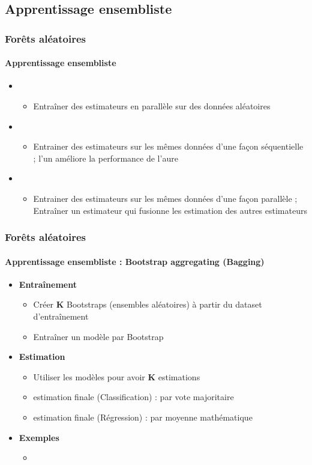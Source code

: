 \documentclass[xcolor=table]{beamer}
\begin{document}
\subsection{Apprentissage ensembliste}

\begin{frame}
	\frametitle{Forêts aléatoires}
	\framesubtitle{Apprentissage ensembliste}
	
	\begin{itemize}
		\item {}
		\begin{itemize}
			\item Entraîner des estimateurs en parallèle sur des données aléatoires
		\end{itemize}
		\item {}
		\begin{itemize}
			\item Entrainer des estimateurs sur les mêmes données d'une façon séquentielle ; l'un améliore la performance de l'aure
		\end{itemize}
		\item {}
		\begin{itemize}
			\item Entrainer des estimateurs sur les mêmes données d'une façon parallèle ; Entraîner un estimateur qui fusionne les estimation des autres estimateurs
		\end{itemize}
	\end{itemize}
	
\end{frame}

\begin{frame}
	\frametitle{Forêts aléatoires}
	\framesubtitle{Apprentissage ensembliste : Bootstrap aggregating (Bagging)}
	
	\begin{itemize}
		\item \textbf{Entraînement}
		\begin{itemize}
			\item Créer \textbf{K} Bootstraps (ensembles aléatoires) à partir du dataset d'entraînement
			\item Entraîner un modèle par Bootstrap
		\end{itemize}
		\item \textbf{Estimation}
		\begin{itemize}
			\item Utiliser les modèles pour avoir \textbf{K} estimations
			\item estimation finale (Classification) : par vote majoritaire
			\item estimation finale (Régression) : par moyenne mathématique
		\end{itemize}
		\item \textbf{Exemples}
		\begin{itemize}
			\item {}
		\end{itemize}
	\end{itemize}
	
\end{frame}
\end{document}
